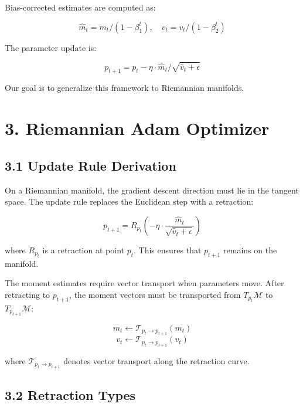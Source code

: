 \documentclass[12pt]{article}
\begin{document}
Bias-corrected estimates are computed as:

\begin{equation}
\hat{m}_t = m_t / (1 - \beta_1^t), \quad \hat{v}_t = v_t / (1 - \beta_2^t)
\end{equation}

The parameter update is:

\begin{equation}
p_{t+1} = p_t - \eta \cdot \hat{m}_t / \sqrt{\hat{v}_t + \epsilon}
\end{equation}

Our goal is to generalize this framework to Riemannian manifolds.

\section{3. Riemannian Adam Optimizer}

\subsection{3.1 Update Rule Derivation}

On a Riemannian manifold, the gradient descent direction must lie in the tangent space. The update rule replaces the Euclidean step with a retraction:

\begin{equation}
p_{t+1} = R_{p_t}\left(-\eta \cdot \frac{\hat{m}_t}{\sqrt{\hat{v}_t + \epsilon}}\right)
\end{equation}

where $R_{p_t}$ is a retraction at point $p_t$. This ensures that $p_{t+1}$ remains on the manifold.

The moment estimates require vector transport when parameters move. After retracting to $p_{t+1}$, the moment vectors must be transported from $T_{p_t}\mathcal{M}$ to $T_{p_{t+1}}\mathcal{M}$:

\begin{equation}
m_t \leftarrow \mathcal{T}_{p_t \to p_{t+1}}(m_t)
\end{equation}
\begin{equation}
v_t \leftarrow \mathcal{T}_{p_t \to p_{t+1}}(v_t)
\end{equation}

where $\mathcal{T}_{p_t \to p_{t+1}}$ denotes vector transport along the retraction curve.

\subsection{3.2 Retraction Types}
\end{document}
